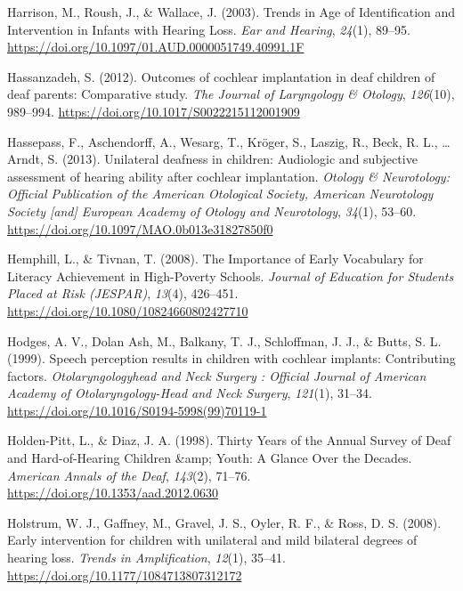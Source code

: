 \documentclass[
  english,
  man]{apa6}
\begin{document}
\leavevmode\hypertarget{ref-harrison2003}{}%
Harrison, M., Roush, J., \& Wallace, J. (2003). Trends in Age of Identification and Intervention in Infants with Hearing Loss. \emph{Ear and Hearing}, \emph{24}(1), 89--95. \url{https://doi.org/10.1097/01.AUD.0000051749.40991.1F}

\leavevmode\hypertarget{ref-hassanzadeh2012}{}%
Hassanzadeh, S. (2012). Outcomes of cochlear implantation in deaf children of deaf parents: Comparative study. \emph{The Journal of Laryngology \& Otology}, \emph{126}(10), 989--994. \url{https://doi.org/10.1017/S0022215112001909}

\leavevmode\hypertarget{ref-hassepass2013}{}%
Hassepass, F., Aschendorff, A., Wesarg, T., Kröger, S., Laszig, R., Beck, R. L., \ldots{} Arndt, S. (2013). Unilateral deafness in children: Audiologic and subjective assessment of hearing ability after cochlear implantation. \emph{Otology \& Neurotology: Official Publication of the American Otological Society, American Neurotology Society {[}and{]} European Academy of Otology and Neurotology}, \emph{34}(1), 53--60. \url{https://doi.org/10.1097/MAO.0b013e31827850f0}

\leavevmode\hypertarget{ref-hemphill2008}{}%
Hemphill, L., \& Tivnan, T. (2008). The Importance of Early Vocabulary for Literacy Achievement in High-Poverty Schools. \emph{Journal of Education for Students Placed at Risk (JESPAR)}, \emph{13}(4), 426--451. \url{https://doi.org/10.1080/10824660802427710}

\leavevmode\hypertarget{ref-hodges1999}{}%
Hodges, A. V., Dolan Ash, M., Balkany, T. J., Schloffman, J. J., \& Butts, S. L. (1999). Speech perception results in children with cochlear implants: Contributing factors. \emph{Otolaryngologyhead and Neck Surgery : Official Journal of American Academy of Otolaryngology-Head and Neck Surgery}, \emph{121}(1), 31--34. \url{https://doi.org/10.1016/S0194-5998(99)70119-1}

\leavevmode\hypertarget{ref-holden-pitt1998}{}%
Holden-Pitt, L., \& Diaz, J. A. (1998). Thirty Years of the Annual Survey of Deaf and Hard-of-Hearing Children \&amp; Youth: A Glance Over the Decades. \emph{American Annals of the Deaf}, \emph{143}(2), 71--76. \url{https://doi.org/10.1353/aad.2012.0630}

\leavevmode\hypertarget{ref-holstrum2008}{}%
Holstrum, W. J., Gaffney, M., Gravel, J. S., Oyler, R. F., \& Ross, D. S. (2008). Early intervention for children with unilateral and mild bilateral degrees of hearing loss. \emph{Trends in Amplification}, \emph{12}(1), 35--41. \url{https://doi.org/10.1177/1084713807312172}
\end{document}
